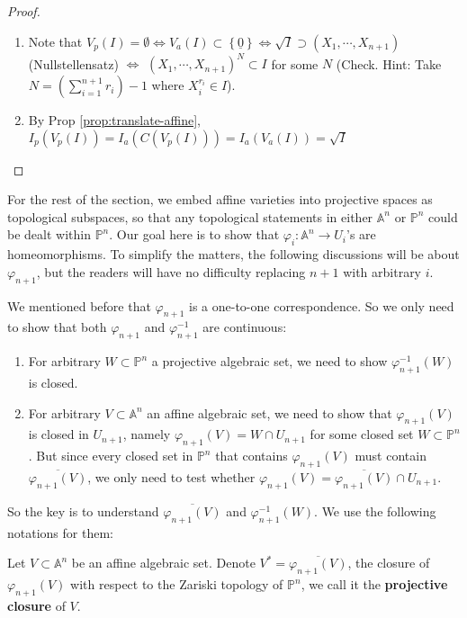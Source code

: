 \documentclass{note-eng}
\begin{document}
\begin{proof}
    \begin{enumerate}
        \item Note that $V_p(I) = \emptyset \Leftrightarrow V_a(I) \subset \left\lbrace \underline{0} \right\rbrace \Leftrightarrow \sqrt{I} \supset (X_1, \cdots, X_{n + 1})$ (Nullstellensatz) $\Leftrightarrow$ $(X_1, \cdots, X_{n + 1})^N \subset I$ for some $N$ (Check. Hint: Take $N = (\sum\limits_{i = 1}^{n + 1} r_i) - 1$ where $X_i^{r_i} \in I$).
        \item By Prop \ref{prop:translate-affine}, $I_p(V_p(I)) = I_a(C(V_p(I))) = I_a(V_a(I)) = \sqrt{I}$
    \end{enumerate}
\end{proof}

For the rest of the section, we embed affine varieties into projective spaces as topological subspaces, so that any topological statements in either $\mathbb{A}^n$ or $\mathbb{P}^n$ could be dealt within $\mathbb{P}^n$. Our goal here is to show that $\varphi_i: \mathbb{A}^n \rightarrow U_i$'s are homeomorphisms. To simplify the matters, the following discussions will be about $\varphi_{n + 1}$, but the readers will have no difficulty replacing $n + 1$ with arbitrary $i$. 

We mentioned before that $\varphi_{n + 1}$ is a one-to-one correspondence. So we only need to show that both $\varphi_{n + 1}$ and $\varphi_{n + 1}^{-1}$ are continuous:
\begin{enumerate}
    \item For arbitrary $W \subset \mathbb{P}^n$ a projective algebraic set, we need to show $\varphi_{n + 1} ^{-1}(W)$ is closed.
    \item For arbitrary $V \subset \mathbb{A}^n$ an affine algebraic set, we need to show that $\varphi_{n + 1}(V)$ is closed in $U_{n + 1}$, namely $\varphi_{n + 1} (V) = W \cap U_{n + 1}$ for some closed set $W \subset \mathbb{P}^n$. But since every closed set in $\mathbb{P}^n$ that contains $\varphi_{n + 1}(V)$ must contain $\overline{\varphi_{n + 1}(V)}$, we only need to test whether $\varphi_{n + 1}(V) = \overline{\varphi_{n + 1}(V)} \cap U_{n + 1}$.
\end{enumerate}
So the key is to understand $\overline{\varphi_{n + 1}(V)}$ and $\varphi_{n + 1} ^{-1}(W)$. We use the following notations for them:

\begin{definition}
    Let $V \subset \mathbb{A}^n$ be an affine algebraic set. Denote $V^\ast = \overline{\varphi_{n + 1}(V)}$, the closure of $\varphi_{n + 1}(V)$ with respect to the Zariski topology of $\mathbb{P}^n$, we call it the \textbf{projective closure} of $V$.
\end{definition}
\end{document}
